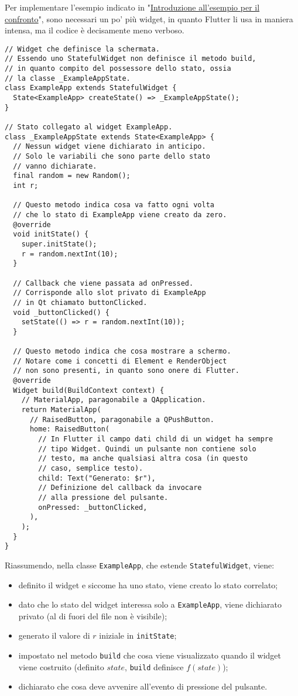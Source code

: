 Per implementare l'esempio indicato in "\hyperref[sec:introduzione-esempio-confronto-paradigmi]{Introduzione all'esempio per il confronto}", sono necessari un po' più widget, in quanto Flutter li usa in maniera intensa, ma il codice è decisamente meno verboso.
\begin{lstlisting}
// Widget che definisce la schermata.
// Essendo uno StatefulWidget non definisce il metodo build,
// in quanto compito del possessore dello stato, ossia
// la classe _ExampleAppState.
class ExampleApp extends StatefulWidget {
  State<ExampleApp> createState() => _ExampleAppState();
}

// Stato collegato al widget ExampleApp.
class _ExampleAppState extends State<ExampleApp> {
  // Nessun widget viene dichiarato in anticipo.
  // Solo le variabili che sono parte dello stato
  // vanno dichiarate.
  final random = new Random();
  int r;
  
  // Questo metodo indica cosa va fatto ogni volta
  // che lo stato di ExampleApp viene creato da zero.
  @override
  void initState() {
    super.initState();
    r = random.nextInt(10);
  }

  // Callback che viene passata ad onPressed.
  // Corrisponde allo slot privato di ExampleApp 
  // in Qt chiamato buttonClicked.
  void _buttonClicked() {
    setState(() => r = random.nextInt(10));
  }

  // Questo metodo indica che cosa mostrare a schermo.
  // Notare come i concetti di Element e RenderObject
  // non sono presenti, in quanto sono onere di Flutter.
  @override
  Widget build(BuildContext context) {
    // MaterialApp, paragonabile a QApplication.
    return MaterialApp(
      // RaisedButton, paragonabile a QPushButton.
      home: RaisedButton(
        // In Flutter il campo dati child di un widget ha sempre 
        // tipo Widget. Quindi un pulsante non contiene solo 
        // testo, ma anche qualsiasi altra cosa (in questo
        // caso, semplice testo).
        child: Text("Generato: $r"),
        // Definizione del callback da invocare
        // alla pressione del pulsante.
        onPressed: _buttonClicked,
      ),
    );
  }
}
\end{lstlisting}
Riassumendo, nella classe \texttt{ExampleApp}, che estende \texttt{StatefulWidget}, viene:
\begin{itemize}
    \item definito il widget e siccome ha uno stato, viene creato lo stato correlato;
    \item dato che lo stato del widget interessa solo a \texttt{ExampleApp}, viene dichiarato privato (al di fuori del file non è visibile);
    \item generato il valore di $r$ iniziale in \texttt{initState};
    \item impostato nel metodo \texttt{build} che cosa viene visualizzato quando il widget viene costruito (definito $state$, \texttt{build} definisce $f(state)$);
    \item dichiarato che cosa deve avvenire all'evento di pressione del pulsante.
\end{itemize}

